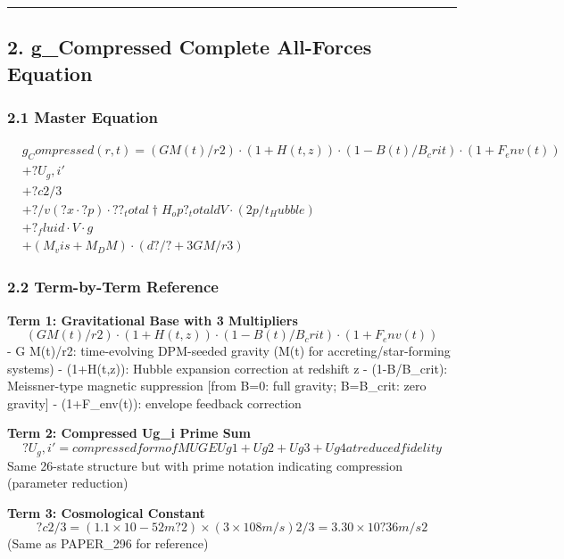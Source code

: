 \begin{center}\rule{0.5\linewidth}{0.5pt}\end{center}

\subsection{2. g\_Compressed Complete All-Forces
Equation}\label{g_compressed-complete-all-forces-equation}

\subsubsection{2.1 Master Equation}\label{master-equation}

\[
\begin{aligned}
  & g_Compressed(r,t) = (G M(t) / r2) \cdot (1 + H(t,z)) \cdot (1 - B(t)/B_crit) \cdot (1 + F_env(t)) \\
  & + ? U_g,i' \\
  & + ? c2 / 3 \\
  & + ? / v(?x\cdot?p) \cdot ? ?_total† H_op ?_total dV \cdot (2p / t_Hubble) \\
  & + ?_fluid \cdot V \cdot g \\
  & + (M_vis + M_DM) \cdot (d?/? + 3G M / r3)
\end{aligned}
\]

\subsubsection{2.2 Term-by-Term Reference}\label{term-by-term-reference}

\textbf{Term 1: Gravitational Base with 3 Multipliers} \[
(G M(t) / r2) \cdot (1 + H(t,z)) \cdot (1 - B(t)/B_crit) \cdot (1 + F_env(t))
\] - G M(t)/r2: time-evolving DPM-seeded gravity (M(t) for
accreting/star-forming systems) - (1+H(t,z)): Hubble expansion
correction at redshift z - (1-B/B\_crit): Meissner-type magnetic
suppression {[}from B=0: full gravity; B=B\_crit: zero gravity{]} -
(1+F\_env(t)): envelope feedback correction

\textbf{Term 2: Compressed Ug\_i Prime Sum} \[
? U_g,i' = compressed form of MUGE Ug1+Ug2+Ug3+Ug4 at reduced fidelity
\] Same 26-state structure but with prime notation indicating
compression (parameter reduction)

\textbf{Term 3: Cosmological Constant} \[
? c2 / 3 = (1.1\times10-52 m?2) \times (3\times108 m/s)2 / 3 = 3.30\times10?36 m/s2
\] (Same as PAPER\_296 for reference)

